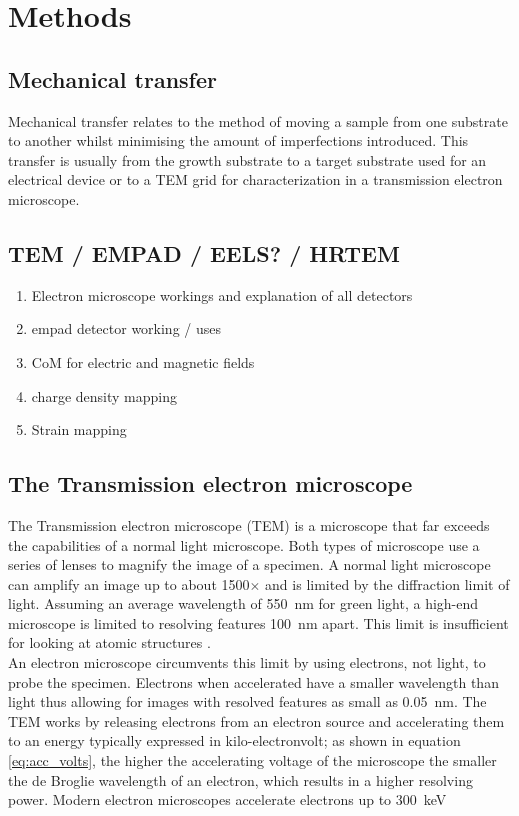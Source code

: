 \section{Methods}
\subsection{Mechanical transfer}
Mechanical transfer relates to the method of moving a sample from one substrate to another whilst minimising the amount of imperfections introduced. This transfer is usually from the growth substrate to a target substrate used for an electrical device or to a TEM grid for characterization in a transmission electron microscope.
\subsection{TEM / EMPAD / EELS? / HRTEM}
\begin{enumerate}
    \item Electron microscope workings and explanation of all detectors
    \item empad detector working / uses
    \item CoM for electric and magnetic fields
    \item charge density mapping
    \item Strain mapping
\end{enumerate}

\subsection{The Transmission electron microscope}
The Transmission electron microscope (TEM) is a microscope that far exceeds the capabilities of a normal light microscope. Both types of microscope use a series of lenses to magnify the image of a specimen.
A normal light microscope can amplify an image up to about 1500$\times$ and is limited by the diffraction limit of light. Assuming an average wavelength of \SI{550}{\nm} for green light, a high-end microscope is limited to resolving features \SI{100}{\nm} apart.
This limit is insufficient for looking at atomic structures \cite{PhysRevLett.106.193905}.\\
An electron microscope circumvents this limit by using electrons, not light, to probe the specimen. Electrons when accelerated have a smaller wavelength than light thus allowing for images with resolved features as small as \SI{0.05}{\nm}. \cite{kisielowski_freitag_bischoff_van}
The TEM works by releasing electrons from an electron source and accelerating them to an energy typically expressed in kilo-electronvolt; as shown in equation \ref{eq:acc_volts}, the higher the accelerating voltage of the microscope the smaller the de Broglie wavelength of an electron, which results in a higher resolving power. Modern electron microscopes accelerate electrons up to \SI{300}{\kilo \electronvolt}

